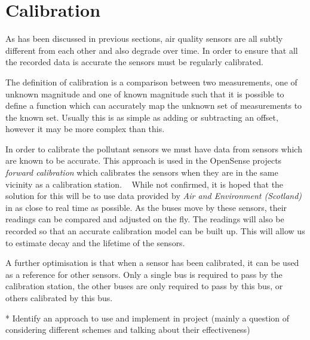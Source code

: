 \section{Calibration}\label{calibration}

As has been discussed in previous sections,  air quality sensors are all subtly different from each other and also degrade over time. In order to ensure that all the recorded data is accurate the sensors must be regularly calibrated. 

The definition of calibration is a comparison between two measurements, one of unknown magnitude and one of known magnitude such that it is possible to define a function which can accurately map the unknown set of measurements to the known set. Usually this is as simple as adding or subtracting an offset, however it may be more complex than this. 

In order to calibrate the pollutant sensors we must have data from sensors which are known to be accurate. This approach is used in the OpenSense projects \emph{forward calibration} which calibrates the sensors when they are in the same vicinity as a calibration station. ~\cite{ontheflycalibration} While not confirmed, it is hoped that the solution for this will be to use data provided by \emph{Air and Environment (Scotland)} in as close to real time as possible. As the buses move by these sensors, their readings can be compared and adjusted on the fly. The readings will also be recorded so that an accurate calibration model can be built up. This will allow us to estimate decay and the lifetime of the sensors. 

A further optimisation is that when a sensor has been calibrated, it can be used as a reference for other sensors. Only a single bus is required to pass by the calibration station, the other buses are only required to pass by this bus, or others calibrated by this bus. 


* Identify an approach to use and implement in project (mainly a question of considering different schemes and talking about their effectiveness)

